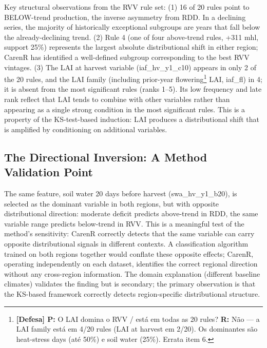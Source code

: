 Key structural observations from the RVV rule set: (1) 16 of 20 rules point to BELOW-trend production, the inverse asymmetry from RDD. In a declining series, the majority of historically exceptional subgroups are years that fall below the already-declining trend. (2) Rule 4 (one of four above-trend rules, +311 mhl, support 25\%) represents the largest absolute distributional shift in either region; CarenR has identified a well-defined subgroup corresponding to the best RVV vintages. (3) The LAI at harvest variable (iaf\_hv\_y1\_c10) appears in only 2 of the 20 rules, and the LAI family (including prior-year flowering\footnote{\textbf{[Defesa] P:} O LAI domina o RVV / está em todas as 20 rules? \textbf{R:} Não --- a LAI family está em 4/20 rules (LAI at harvest em 2/20). Os dominantes são heat-stress days (até 50\%) e soil water (25\%). Errata item 6.} LAI, iaf\_fl) in 4; it is absent from the most significant rules (ranks 1--5). Its low frequency and late rank reflect that LAI tends to combine with other variables rather than appearing as a single strong condition in the most significant rules. This is a property of the KS-test-based induction: LAI produces a distributional shift that is amplified by conditioning on additional variables.


\subsection{The Directional Inversion: A Method Validation Point}\label{sub:the_directional_inversion_a}

The same feature, soil water 20 days before harvest (swa\_hv\_y1\_b20), is selected as the dominant variable in both regions, but with opposite distributional direction: moderate deficit predicts above-trend in RDD, the same variable range predicts below-trend in RVV. This is a meaningful test of the method's sensitivity: CarenR correctly detects that the same variable can carry opposite distributional signals in different contexts. A classification algorithm trained on both regions together would conflate these opposite effects; CarenR, operating independently on each dataset, identifies the correct regional direction without any cross-region information. The domain explanation (different baseline climates) validates the finding but is secondary; the primary observation is that the KS-based framework correctly detects region-specific distributional structure.

